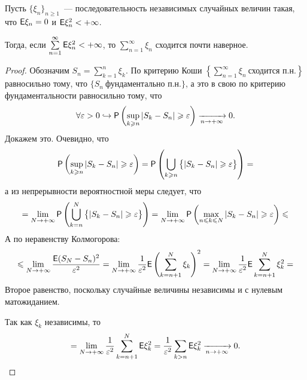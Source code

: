 \begin{theorem}
	Пусть $\{\xi_n \}_{n \geqslant 1}$~--- последовательность независимых случайных величин такая, что $\E \xi_n = 0 $ и $\E \xi_n^2 < +\infty$. 
	
	Тогда, если $\sum\limits_{n = 1}^{\infty} \E \xi_n^2 < +\infty$, то $ \sum\limits_{n = 1}^{\infty} \xi_n$ сходится почти наверное.
	\begin{proof}
		Обозначим $S_n = \sum\limits_{k=1}^n \xi_k$. По критерию Коши $\left\{ \sum\limits_{n = 1}^{\infty}\xi_n~\text{сходится п.н.} \right\}$ равносильно тому, что $\{ S_n~\text{фундаментально п.н.}\}$, а это в свою по критерию фундаментальности равносильно тому, что 
		$$\forall \varepsilon > 0 \hookrightarrow \P \left( \sup\limits_{k \geqslant n} | S_k - S_n | \geqslant \varepsilon \right) \limn 0.$$ Докажем это.
		 Очевидно, что
		 $$\P \left( \sup\limits_{k \geqslant n} | S_k - S_n | \geqslant \varepsilon \right) = \P \left( \bigcup\limits_{k \geqslant n} \big\{| S_k - S_n | \geqslant \varepsilon \big\} \right) =$$
		 а из непрерывности вероятностной меры следует, что 
		 $$= \lim\limits_{N \rightarrow +\infty} \P \left( \bigcup\limits_{k = n}^{N} \big\{| S_k - S_n | \geqslant \varepsilon \big\} \right) = \lim\limits_{N \rightarrow +\infty} \P \left( \max\limits_{n \leqslant k \leqslant N} | S_k - S_n | \geqslant \varepsilon \right) \leqslant$$
		 А по неравенству Колмогорова:
		 $$\leqslant \lim\limits_{N \rightarrow + \infty} \dfrac{\E ( S_N - S_n)^2}{\varepsilon^2} = \lim\limits_{N \rightarrow + \infty} \dfrac{1}{\varepsilon^2} \E \left(\sum\limits_{k = n + 1}^N \xi_k\right)^2 = \lim\limits_{N \rightarrow + \infty} \dfrac{1}{\varepsilon^2} \E \sum\limits_{k = n + 1}^N \xi_k^2 = $$
		 Второе равенство, поскольку случайные величины независимы и с нулевым матожиданием.
		 
		 Так как $\xi_k$ независимы, то
		 $$= \lim\limits_{N \rightarrow + \infty} \dfrac{1}{\varepsilon^2} \sum\limits_{k = n + 1}^N \E \xi_k^2 = \dfrac{1}{\varepsilon^2} \sum\limits_{k > n} \E \xi_k^2 \limn 0.$$
	\end{proof}
\end{theorem}

